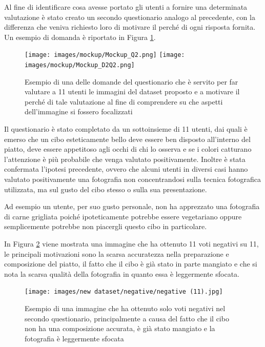 Al fine di identificare cosa avesse portato gli utenti a fornire una determinata valutazione è stato creato un secondo questionario analogo al precedente, con la differenza che veniva richiesto loro di motivare il perché di ogni risposta fornita. Un esempio di domanda è riportato in Figura \ref{questionario2}.

\begin{figure}[H]
\centering
\texttt{[image: images/mockup/Mockup\_Q2.png]}
\quad
\texttt{[image: images/mockup/Mockup\_D2Q2.png]}
\quad
\caption{Esempio di una delle domande del questionario che è servito per far valutare a 11 utenti le immagini del dataset proposto e a motivare il perché di tale valutazione al fine di comprendere su che aspetti dell'immagine si fossero focalizzati}
\label{questionario2}
\end{figure}

Il questionario è stato completato da un sottoinsieme di 11 utenti, dai quali è emerso che un cibo esteticamente bello deve essere ben disposto all'interno del piatto, deve essere appetitoso agli occhi di chi lo osserva e se i colori catturano l'attenzione è più probabile che venga valutato positivamente. Inoltre è stata confermata l'ipotesi precedente, ovvero che alcuni utenti in diversi casi hanno valutato positivamente una fotografia non concentrandosi sulla tecnica fotografica utilizzata, ma sul gusto del cibo stesso o sulla sua presentazione. 

Ad esempio un utente, per suo gusto personale, non ha apprezzato una fotografia di carne grigliata poiché ipoteticamente potrebbe essere vegetariano oppure semplicemente potrebbe non piacergli questo cibo in particolare.

In Figura \ref{esempioNeg} viene mostrata una immagine che ha ottenuto  11 voti negativi su 11, le principali motivazioni sono la scarsa accuratezza nella preparazione e composizione del piatto, il fatto che il cibo è già stato in parte mangiato e che si nota la scarsa qualità della fotografia in quanto essa è leggermente sfocata.

\begin{figure}[H]
\centering
\texttt{[image: images/new dataset/negative/negative (11).jpg]}
\caption{Esempio di una immagine che ha ottenuto solo voti negativi nel secondo questionario, principalmente a causa del fatto che il cibo non ha una composizione accurata, è già stato mangiato e la fotografia è leggermente sfocata}
\label{esempioNeg}
\end{figure}

